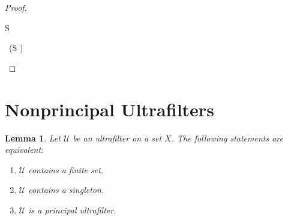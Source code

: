 \documentclass[10pt,a4paper]{book}
\newtheorem{lemma}{Lemma}[section]
\begin{document}
\begin{proof}
\begin{fitchproof}[arrayenv=tabular]
         { S } 

         { \subseteq{} }

         { \in{} }

         {  } 

        \close

         {    } 

         { \exists{}\in{}  } 



         { \exists{}\, (S \subseteq{}) } 

    \end{fitchproof}

\end{proof}





\section{Nonprincipal Ultrafilters}







\begin{lemma}
    Let $\mathcal{U}$ be an ultrafilter on a set $X$. The following
    statements are equivalent:
    \begin{enumerate}
        \item $\mathcal{U}$ contains a finite set.
        \item $\mathcal{U}$ contains a singleton.
        \item $\mathcal{U}$ is a principal ultrafilter.
    \end{enumerate}
\end{lemma}
\end{document}
